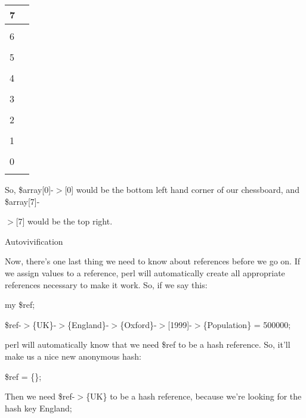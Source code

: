 \documentclass[a4paper,11pt]{book}
\begin{document}
\begin{tabular}{|p{1.2in}|p{0.3in}|} \hline 
7 &  \\ \hline 
 &  \\ \hline 
6 &  \\ \hline 
 &  \\ \hline 
5 &  \\ \hline 
 &  \\ \hline 
4 &  \\ \hline 
 &  \\ \hline 
3 &  \\ \hline 
 &  \\ \hline 
2 &  \\ \hline 
 &  \\ \hline 
1 &  \\ \hline 
 &  \\ \hline 
0 &  \\ \hline 
 &  \\ \hline 
\end{tabular}



\noindent 

\noindent So, \$array[0]-$>$[0] would be the bottom left hand corner of our chessboard, and \$array[7]-

\noindent $>$[7] would be the top right.

\noindent 

\noindent Autovivification

\noindent 

\noindent Now, there's one last thing we need to know about references before we go on. If we assign values to a reference, perl will automatically create all appropriate references necessary to make it work. So, if we say this:

\noindent 

\noindent my \$ref;

\noindent \$ref-$>$\{UK\}-$>$\{England\}-$>$\{Oxford\}-$>$[1999]-$>$\{Population\} = 500000;

\noindent 

\noindent perl will automatically know that we need \$ref to be a hash reference. So, it'll make us a nice new anonymous hash:

\noindent 

\noindent 

\noindent \$ref = \{\};

\noindent 

\noindent Then we need \$ref-$>$\{UK\} to be a hash reference, because we're looking for the hash key England;
\end{document}
